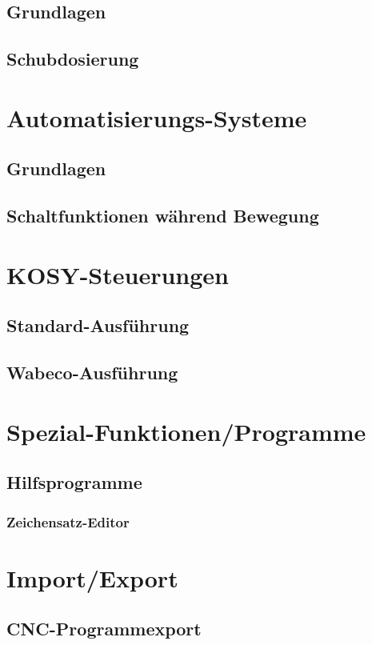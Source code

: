 \documentclass[a5paper]{book}
\begin{document}
	\section{Grundlagen} 
	\section{Schubdosierung} 
 
\chapter{Automatisierungs-Systeme}
	\section{Grundlagen} 
	\section{Schaltfunktionen während Bewegung} 
 
\chapter{KOSY-Steuerungen} 
	\section{Standard-Ausführung} 
	\section{Wabeco-Ausführung} 

\chapter{Spezial-Funktionen/Programme} 
	\section{Hilfsprogramme} 
		\subsection{Zeichensatz-Editor} 

\chapter{Import/Export} 
	\section{CNC-Programmexport} 
\end{document}
